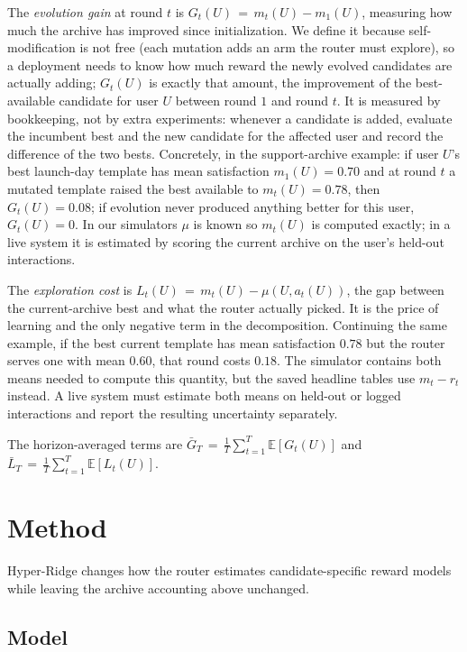 \documentclass{article} %
\providecommand{\E}{\mathbb{E}}
\begin{document}
The \emph{evolution gain} at round $t$ is $G_t(U) \,=\, m_t(U) - m_1(U)$, measuring how much the archive has improved since initialization. We define it because self-modification is not free (each mutation adds an arm the router must explore), so a deployment needs to know how much reward the newly evolved candidates are actually adding; $G_t(U)$ is exactly that amount, the improvement of the best-available candidate for user $U$ between round $1$ and round $t$. It is measured by bookkeeping, not by extra experiments: whenever a candidate is added, evaluate the incumbent best and the new candidate for the affected user and record the difference of the two bests. Concretely, in the support-archive example: if user $U$'s best launch-day template has mean satisfaction $m_1(U) = 0.70$ and at round $t$ a mutated template raised the best available to $m_t(U) = 0.78$, then $G_t(U) = 0.08$; if evolution never produced anything better for this user, $G_t(U) = 0$. In our simulators $\mu$ is known so $m_t(U)$ is computed exactly; in a live system it is estimated by scoring the current archive on the user's held-out interactions.

The \emph{exploration cost} is $L_t(U) \,=\, m_t(U) - \mu(U, a_t(U))$, the gap between the current-archive best and what the router actually picked. It is the price of learning and the only negative term in the decomposition. Continuing the same example, if the best current template has mean satisfaction $0.78$ but the router serves one with mean $0.60$, that round costs $0.18$. The simulator contains both means needed to compute this quantity, but the saved headline tables use \(m_t-r_t\) instead. A live system must estimate both means on held-out or logged interactions and report the resulting uncertainty separately.


The horizon-averaged terms are $\bar G_T \,=\, \frac{1}{T}\sum_{t=1}^T \E[G_t(U)]$ and $\bar L_T \,=\, \frac{1}{T}\sum_{t=1}^T \E[L_t(U)]$.

\section{Method}
\label{sec:method}

Hyper-Ridge changes how the router estimates candidate-specific reward models while leaving the archive accounting above unchanged.

\subsection{Model}
\label{sec:method-model}
\end{document}
